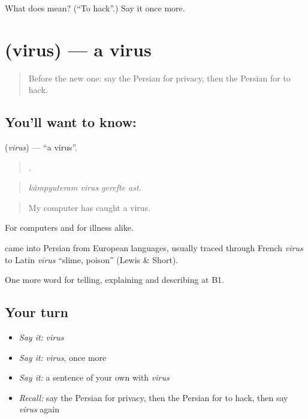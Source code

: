 \begin{tcolorbox}[breakable,colback=teal!4,colframe=teal!35!black,title={Before you move on}]
What does   mean? (\textquotedblleft{}To hack\textquotedblright{}.) Say it once more.
\end{tcolorbox}
\section[\texorpdfstring{\fa{ویروس} (virus)}{ویروس (virus)}]{ (virus) — a virus}

\label{lesson:FA-C419-virus}



\begin{quote}
Before the new one: say the Persian for privacy, then the Persian for to hack.
\end{quote}

\subsection*{You'll want to know: }
\textbf{} (\emph{virus}) — \textquotedblleft{}a virus\textquotedblright{}.

\begin{quote}
   .
\end{quote}

\begin{quote}
\emph{kâmpyuteram virus gerefte ast.}
\end{quote}

\begin{quote}
My computer has caught a virus.
\end{quote}

For computers and for illness alike.

\begin{cousinweb}
\textbf{} came into Persian from European languages, usually traced through French \emph{virus} to Latin \emph{vīrus} \textquotedblleft{}slime, poison\textquotedblright{} (Lewis \& Short).
\end{cousinweb}

\begin{grammarlens}[title={What you've built}]
One more word for telling, explaining and describing at B1.
\end{grammarlens}

\subsection*{Your turn}
\begin{itemize}
\raggedright
  \item \emph{Say it:} \emph{virus}
  \item \emph{Say it:} \emph{virus}, once more
  \item \emph{Say it:} a sentence of your own with \emph{virus}
  \item \emph{Recall:} say the Persian for privacy, then the Persian for to hack, then say \emph{virus} again
\end{itemize}

